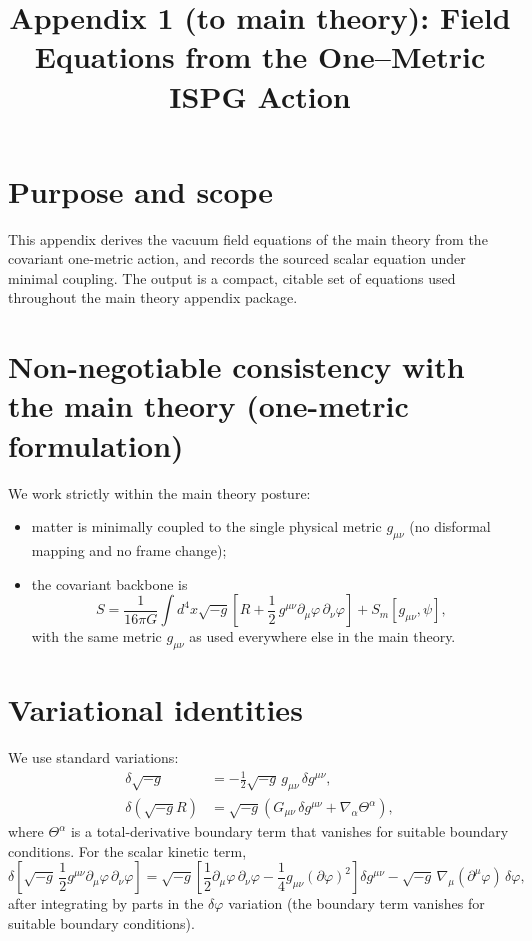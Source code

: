 \documentclass[11pt]{article}
\title{Appendix 1 (to main theory): Field Equations from the One--Metric ISPG Action}
\author{}
\date{}
\begin{document}
\let\phi\varphi
\maketitle

\setcounter{section}{0}

\section*{Purpose and scope}
This appendix derives the vacuum field equations of the main theory from the covariant one-metric action, and records the sourced scalar equation under minimal coupling. The output is a compact, citable set of equations used throughout the main theory appendix package.

\section*{Non-negotiable consistency with the main theory (one-metric formulation)}
We work strictly within the main theory posture:
\begin{itemize}
\item matter is minimally coupled to the single physical metric $g_{\mu\nu}$ (no disformal mapping and no frame change);
\item the covariant backbone is
\begin{equation}
S=\frac{1}{16\pi G}\int d^4x\sqrt{-g}\left[R+\frac12\,g^{\mu\nu}\partial_\mu\phi\,\partial_\nu\phi\right]+S_m[g_{\mu\nu},\psi],
\label{eq:action_app1}
\end{equation}
with the same metric $g_{\mu\nu}$ as used everywhere else in the main theory.
\end{itemize}

\section{Variational identities}\label{sec:idents}
We use standard variations:
\begin{align}
\delta\sqrt{-g}&=-\frac12\sqrt{-g}\,g_{\mu\nu}\,\delta g^{\mu\nu},\\
\delta(\sqrt{-g}R)&=\sqrt{-g}\left(G_{\mu\nu}\,\delta g^{\mu\nu}+\nabla_\alpha \Theta^\alpha\right),
\end{align}
where $\Theta^\alpha$ is a total-derivative boundary term that vanishes for suitable boundary conditions.
For the scalar kinetic term,
\begin{equation}
\delta\!\left[\sqrt{-g}\,\frac12 g^{\mu\nu}\partial_\mu\phi\,\partial_\nu\phi\right]
=\sqrt{-g}\left[\frac12\partial_\mu\phi\,\partial_\nu\phi-\frac14 g_{\mu\nu}(\partial\phi)^2\right]\delta g^{\mu\nu}
-\sqrt{-g}\,\nabla_\mu(\partial^\mu\phi)\,\delta\phi,
\label{eq:scalarvar}
\end{equation}
after integrating by parts in the $\delta\phi$ variation (the boundary term vanishes for suitable boundary conditions).
\end{document}
